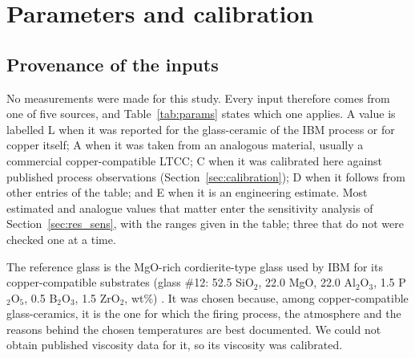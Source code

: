 \section{Parameters and calibration}
\label{sec:params}

\subsection{Provenance of the inputs}

No measurements were made for this study. Every input therefore comes from one of five sources, and Table~\ref{tab:params} states which one applies. A value is labelled L when it was reported for the glass-ceramic of the IBM process or for copper itself; A when it was taken from an analogous material, usually a commercial copper-compatible LTCC; C when it was calibrated here against published process observations (Section~\ref{sec:calibration}); D when it follows from other entries of the table; and E when it is an engineering estimate. Most estimated and analogue values that matter enter the sensitivity analysis of Section~\ref{sec:res_sens}, with the ranges given in the table; three that do not were checked one at a time.

The reference glass is the MgO-rich cordierite-type glass used by IBM for its copper-compatible substrates (glass \#12: 52.5 SiO$_2$, 22.0 MgO, 22.0 Al$_2$O$_3$, 1.5 P$_2$O$_5$, 0.5 B$_2$O$_3$, 1.5 ZrO$_2$, wt\%) \cite{herron1980method,kumar1981glassceramic}. It was chosen because, among copper-compatible glass-ceramics, it is the one for which the firing process, the atmosphere and the reasons behind the chosen temperatures are best documented. We could not obtain published viscosity data for it, so its viscosity was calibrated.


